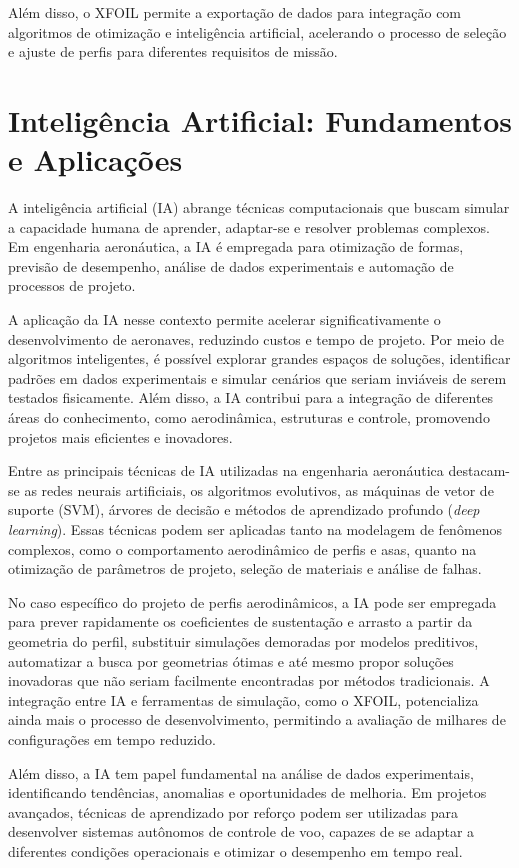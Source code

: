 Além disso, o XFOIL permite a exportação de dados para integração com algoritmos de otimização e inteligência artificial, acelerando o processo de seleção e ajuste de perfis para diferentes requisitos de missão.

\section{Inteligência Artificial: Fundamentos e Aplicações}
A inteligência artificial (IA) abrange técnicas computacionais que buscam simular a capacidade humana de aprender, adaptar-se e resolver problemas complexos. Em engenharia aeronáutica, a IA é empregada para otimização de formas, previsão de desempenho, análise de dados experimentais e automação de processos de projeto.

A aplicação da IA nesse contexto permite acelerar significativamente o desenvolvimento de aeronaves, reduzindo custos e tempo de projeto. Por meio de algoritmos inteligentes, é possível explorar grandes espaços de soluções, identificar padrões em dados experimentais e simular cenários que seriam inviáveis de serem testados fisicamente. Além disso, a IA contribui para a integração de diferentes áreas do conhecimento, como aerodinâmica, estruturas e controle, promovendo projetos mais eficientes e inovadores.

Entre as principais técnicas de IA utilizadas na engenharia aeronáutica destacam-se as redes neurais artificiais, os algoritmos evolutivos, as máquinas de vetor de suporte (SVM), árvores de decisão e métodos de aprendizado profundo (\textit{deep learning}). Essas técnicas podem ser aplicadas tanto na modelagem de fenômenos complexos, como o comportamento aerodinâmico de perfis e asas, quanto na otimização de parâmetros de projeto, seleção de materiais e análise de falhas.

No caso específico do projeto de perfis aerodinâmicos, a IA pode ser empregada para prever rapidamente os coeficientes de sustentação e arrasto a partir da geometria do perfil, substituir simulações demoradas por modelos preditivos, automatizar a busca por geometrias ótimas e até mesmo propor soluções inovadoras que não seriam facilmente encontradas por métodos tradicionais. A integração entre IA e ferramentas de simulação, como o XFOIL, potencializa ainda mais o processo de desenvolvimento, permitindo a avaliação de milhares de configurações em tempo reduzido.

Além disso, a IA tem papel fundamental na análise de dados experimentais, identificando tendências, anomalias e oportunidades de melhoria. Em projetos avançados, técnicas de aprendizado por reforço podem ser utilizadas para desenvolver sistemas autônomos de controle de voo, capazes de se adaptar a diferentes condições operacionais e otimizar o desempenho em tempo real.

